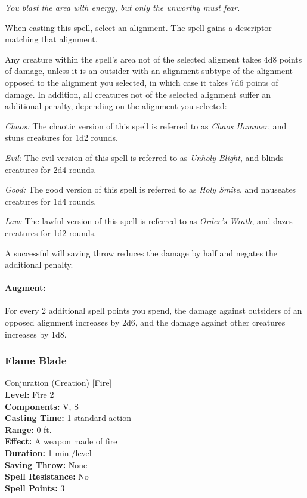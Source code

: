 \emph{You blast the area with energy, but only the unworthy must fear.}

When casting this spell, select an alignment. The spell gains a descriptor matching that alignment.

Any creature within the spell's area not of the selected aligment takes 4d8 points of damage, 
unless it is an outsider with an alignment subtype of the alignment opposed to the alignment you selected,
in which case it takes 7d6 points of damage.
In addition, all creatures not of the selected alignment suffer an additional penalty, depending on the alignment you selected:
\begin{list}{}{\leftmargin=1em}
 \item \emph{Chaos:} The chaotic version of this spell is referred to as \emph{Chaos Hammer}, and stuns creatures for 1d2 rounds.
 \item \emph{Evil:} The evil version of this spell is referred to as \emph{Unholy Blight}, and blinds creatures for 2d4 rounds.
 \item \emph{Good:} The good version of this spell is referred to as \emph{Holy Smite}, and nauseates creatures for 1d4 rounds.
 \item \emph{Law:} The lawful version of this spell is referred to as \emph{Order's Wrath}, and dazes creatures for 1d2 rounds.
\end{list}
A successful will saving throw reduces the damage by half and negates the additional penalty.

\paragraph{Augment:} For every 2 additional spell points you spend, 
the damage against outsiders of an opposed alignment increases by 2d6, 
and the damage against other creatures increases by 1d8.
\subsubsection{Flame Blade}
\label{Spell:FlameBlade}
Conjuration (Creation) [Fire]
\\ \textbf{Level:} Fire 2
\\ \textbf{Components:} V, S
\\ \textbf{Casting Time:} 1 standard action
\\ \textbf{Range:} 0 ft.
\\ \textbf{Effect:} A weapon made of fire
\\ \textbf{Duration:} 1 min./level
\\ \textbf{Saving Throw:} None
\\ \textbf{Spell Resistance:} No
\\ \textbf{Spell Points:} 3

